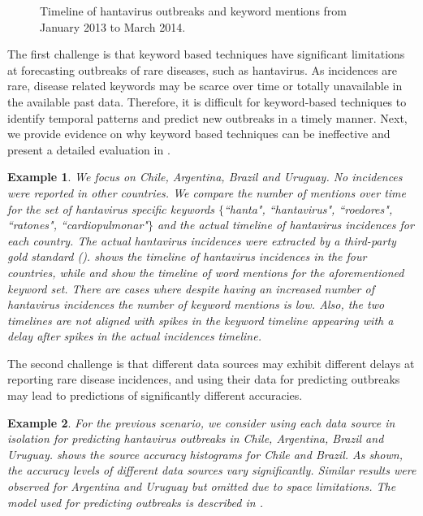 \documentclass[twoside,leqno,twocolumn]{article}
\newtheorem{example}{Example}
\begin{document}
\begin{figure}[h]
\begin{center}
        \vspace{-15pt}
\end{center}
\caption{Timeline of hantavirus outbreaks and keyword mentions from January 2013 to March 2014.}
\label{fig:hanta_timelines}
\end{figure}


The first challenge is that keyword based techniques have significant limitations at forecasting outbreaks of rare diseases, such as hantavirus. As incidences are rare, disease related keywords may be scarce over time or totally unavailable in the available past data. Therefore, it is difficult for keyword-based techniques to identify temporal patterns and predict new outbreaks in a timely manner. Next, we provide evidence on why keyword based techniques can be ineffective and present a detailed evaluation in .

\vspace{-5pt}\begin{example}
We focus on Chile, Argentina, Brazil and Uruguay. No incidences were reported in other countries. We compare the number of mentions over time for the set of hantavirus specific keywords $\{$``hanta", ``hantavirus", ``roedores", ``ratones", ``cardiopulmonar"$\}$ and the actual timeline of hantavirus incidences for each country. The actual hantavirus incidences were extracted by a third-party gold standard ().   shows the timeline of hantavirus incidences in the four countries, while  and  show the timeline of word mentions for the aforementioned keyword set. There are cases where despite having an increased number of hantavirus incidences the number of keyword mentions is low. Also, the two timelines are not aligned with spikes in the keyword timeline appearing with a delay after spikes in the actual incidences timeline.
\end{example}

The second challenge is that different data sources may exhibit different delays at reporting rare disease incidences, and using their data for predicting outbreaks may lead to predictions of significantly different accuracies. 

\begin{example}
For the previous scenario, we consider using each data source in isolation for predicting hantavirus outbreaks in Chile, Argentina, Brazil and Uruguay.  shows the source accuracy histograms for Chile and Brazil. As shown, the accuracy levels of different data sources vary significantly. Similar results were observed for Argentina and Uruguay but omitted due to space limitations. The model used for predicting outbreaks is described in .
\end{example}
\end{document}
